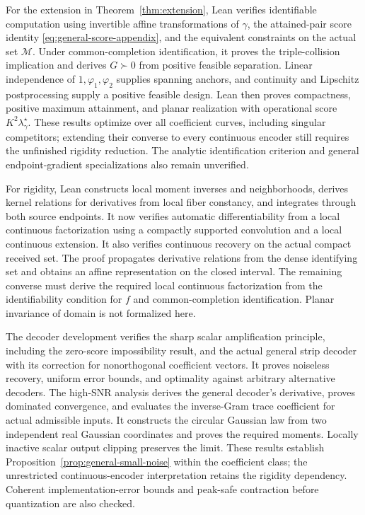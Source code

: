 For the extension in Theorem~\ref{thm:extension}, Lean verifies identifiable computation using invertible affine transformations of $\gamma$, the attained-pair score identity \eqref{eq:general-score-appendix}, and the equivalent constraints on the actual set $\mathcal M$. Under common-completion identification, it proves the triple-collision implication and derives $G\succ0$ from positive feasible separation. Linear independence of $1,\varphi_1,\varphi_2$ supplies spanning anchors, and continuity and Lipschitz postprocessing supply a positive feasible design. Lean then proves compactness, positive maximum attainment, and planar realization with operational score $K^2\lambda_\gamma^\star$. These results optimize over all coefficient curves, including singular competitors; extending their converse to every continuous encoder still requires the unfinished rigidity reduction. The analytic identification criterion and general endpoint-gradient specializations also remain unverified.

For rigidity, Lean constructs local moment inverses and neighborhoods, derives kernel relations for derivatives from local fiber constancy, and integrates through both source endpoints. It now verifies automatic differentiability from a local continuous factorization using a compactly supported convolution and a local continuous extension. It also verifies continuous recovery on the actual compact received set. The proof propagates derivative relations from the dense identifying set and obtains an affine representation on the closed interval. The remaining converse must derive the required local continuous factorization from the identifiability condition for $f$ and common-completion identification. Planar invariance of domain is not formalized here.

The decoder development verifies the sharp scalar amplification principle, including the zero-score impossibility result, and the actual general strip decoder with its correction for nonorthogonal coefficient vectors. It proves noiseless recovery, uniform error bounds, and optimality against arbitrary alternative decoders. The high-SNR analysis derives the general decoder's derivative, proves dominated convergence, and evaluates the inverse-Gram trace coefficient for actual admissible inputs. It constructs the circular Gaussian law from two independent real Gaussian coordinates and proves the required moments. Locally inactive scalar output clipping preserves the limit. These results establish Proposition~\ref{prop:general-small-noise} within the coefficient class; the unrestricted continuous-encoder interpretation retains the rigidity dependency. Coherent implementation-error bounds and peak-safe contraction before quantization are also checked.

